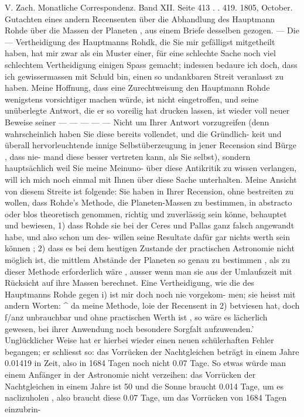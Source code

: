 \documentclass[10pt,a4paper]{article}
\begin{document}
V.  Zach.     Monatliche  Correspondenz.     Band  XII.  Seite  413  .  .  419.     1805,  October.
Gutachten  eines  andern  Recensenten  über  die  Abhandlung  des  Hauptmann  Rohde
über  die  Massen  der  Planeten ,  aus  einem  Briefe  desselben  gezogen.
---  Die   ---  Vertheidigung  des  Hauptmanns  Rohdk,  die  Sie  mir  gefälligst  mitgetheilt
haben,  hat  mir  zwar  als  ein  Muster  einer,  für  eine  schlechte  Sache  noch  viel  schlechtem  Vertheidigung
einigen  Spass  gemacht;  indessen  bedaure  ich  doch,  dass  ich  gewissermassen  mit  Schuld  bin,  einen  so
undankbaren  Streit  veranlasst  zu  haben.  Meine  Hoffnung,  dass  eine  Zurechtweisung  den  Hauptmann
Rohde  wenigstens  vorsichtiger  machen  würde,  ist  nicht  eingetroffen,  und  seine  unüberlegte  Antwort,
die  er  so  voreilig  hat  drucken  lassen,  ist  wieder  voll  neuer  Beweise  seiner  ---  ---  ---  ---  ---  Nicht  um
Ihrer  Antwort  vorzugreifen  (denn  wahrscheinlich  haben  Sie  diese  bereits  vollendet,  und  die  Gründlich-
keit und  überall  hervorleuchtende  innige  Selbstüberzeugung  in  jener  Recension  sind  Bürge ,  dass  nie-
mand diese  besser  vertreten  kann,  als  Sie  selbst),  sondern  hauptsächlich  weil  Sie  meine  Meinuno-  über
diese  Antikritik  zu  wissen  verlangen,  will  ich  mich  noch  einmal  mit  Ihnen  über  diese  Sache  unterhalten.
Meine  Ansicht  von  diesem  Streite  ist  folgende:  Sie  haben  in  Ihrer  Recension,  ohne  bestreiten
zu  wollen,  dass  Rohde's  Methode,  die  Planeten-Massen  zu  bestimmen,  in  abstracto  oder  blos  theoretisch
genommen,  richtig  und  zuverlässig  sein  könne,  behauptet  und  bewiesen,
1)  dass  Rohde  sie  bei  der  Ceres  und  Pallas  ganz  falsch  angewandt  habe,  und  also  schon  um  des-
willen seine  Resultate  dafür  gar  nichts  werth  sein  können ;
2)  dass  es  bei  dem  heutigen  Zustande  der  practischen  Astronomie  nicht  möglich  ist,  die  mittlem
Abstände  der  Planeten  so  genau  zu  bestimmen ,  als  zu  dieser  Methode  erforderlich  wäre ,  ausser  wenn
man  sie  aus  der  Umlaufszeit  mit  Rücksicht  auf  ihre  Massen  berechnet.
Eine  Vertheidigung,  wie  die  des  Hauptmanns  Rohde  gegen  i)  ist  mir  doch  noch  nie  vorgekom-
men; sie  heisst  mit  andern  Worten:  \textasciicircum{}  da  meine  Methode,  loie  der  Recensent  in  2)  betviesen  hat,  doch
f/anz  unbrauchbar  und  ohne  practischen  Werth  ist ,  so  wäre  es  lächerlich  gewesen,  bei  ihrer  Anwendung  noch
besondere  Sorgfalt  aufzuwenden.'  Unglücklicher  Weise  hat  er  hierbei  wieder  einen  neuen  schülerhaften
Fehler  begangen;  er  schliesst  so:  das  Vorrücken  der  Nachtgleichen  beträgt  in  einem  Jahre  0.01419  in
Zeit,  also  in  1684  Tagen  noch  nicht  0.07  Tage.  So  etwas  würde  man  einem  Anfänger  in  der  Astronomie
nicht  verzeihen:  das  Vorrücken  der  Nachtgleichen  in  einem  Jahre  ist  50\glqq{}  und  die  Sonne  braucht  0.014
Tage,  um  es  naclizuholen ,  also  braucht  diese  0.07  Tage,   um   das  Vorrücken   von  1684  Tagen  einzubrin-
\end{document}

